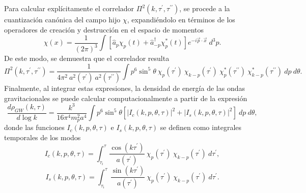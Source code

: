 Para calcular explícitamente el correlador $\Pi^{2} \left( k, \tau^\prime, \tau^{\prime\prime} \right)$, se procede a la cuantización canónica del campo hijo $\chi$, expandiéndolo en términos de los operadores de creación y destrucción en el espacio de momentos
\begin{equation}
    \chi (x) = \frac{1}{(2 \pi)^3} \int \left[ \hat{a}_p \chi_p (t) + \hat{a}^\dagger_{-p} \chi^*_p(t) \right] e^{- i \vec{p} \cdot \vec{x}} ~ d^3 p.
\end{equation}
De este modo, se demuestra que el correlador resulta
\begin{equation}
    \Pi^2 \left( k, \tau^\prime, \tau^{\prime \prime} \right) = \frac{1}{4 \pi^2 ~ a^2 \left( \tau^\prime \right) ~ a^2 \left( \tau^{\prime \prime} \right)} \int p^6 \sin^5 \theta ~ \chi_p (\tau^\prime) ~ \chi_{k - p} (\tau^\prime) ~ \chi_p^* \left( \tau^{\prime\prime} \right) ~ \chi_{k - p}^* \left( \tau^{\prime\prime} \right) ~ dp ~ d\theta.
\end{equation}
Finalmente, al integrar estas expresiones, la densidad de energía de las ondas gravitacionales se puede calcular computacionalmente a partir de la expresión \cite{Dufaux_2007}
\begin{equation}\label{eqn:GW_production}
    \frac{d \rho_{GW} (k, \tau)}{d \log k} = \frac{k^3}{16 \pi^4 m_p^2 a^4} \int p^6 \sin^5 \theta \left[ \left| I_c \left( k, p, \theta, \tau \right) \right|^2 + \left| I_s \left( k, p, \theta, \tau \right) \right|^2 \right] ~ dp ~ d\theta,
\end{equation}
donde las funciones $I_c \left( k, p, \theta, \tau \right)$ e $I_s \left( k, p, \theta, \tau \right)$ se definen como integrales temporales de los modos
\begin{equation}\label{eqn:Ic}
    I_c \left( k, p, \theta, \tau \right) = \int_{\tau_i}^{\tau} \frac{\cos \left( k \tau^\prime \right)}{a \left( \tau^\prime \right)} ~ \chi_p \left( \tau^\prime \right) ~ \chi_{k - p} \left( \tau^\prime \right) ~ d\tau^\prime,
\end{equation}
\begin{equation}\label{eqn:Is}
    I_s \left( k, p, \theta, \tau \right) = \int_{\tau_i}^{\tau} \frac{\sin \left( k \tau^\prime \right)}{a \left( \tau^\prime \right)} ~ \chi_p \left( \tau^\prime \right) ~ \chi_{k - p} \left( \tau^\prime \right) ~ d\tau^\prime.
\end{equation}
